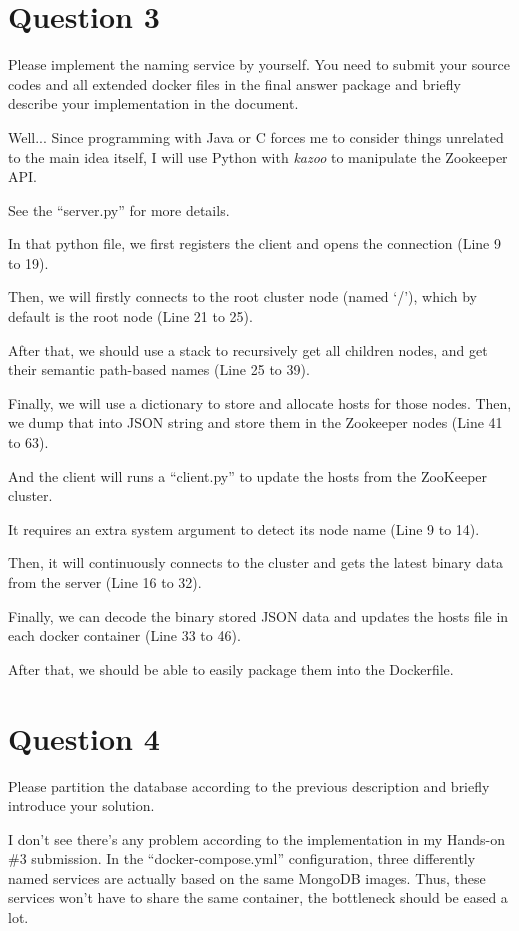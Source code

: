 \documentclass[11pt, oneside]{article}   	%
\begin{document}
\section*{Question 3}
Please implement the naming service by yourself. You need to submit your source codes and all extended docker files in the final answer package and briefly describe your implementation in the document.
\newline

Well... Since programming with Java or C forces me to consider things unrelated to the main idea itself, I will use Python with \textit{kazoo} to manipulate the Zookeeper API.
\newline

See the ``server.py'' for more details.

In that python file, we first registers the client and opens the connection (Line 9 to 19).

Then, we will firstly connects to the root cluster node (named `/'), which by default is the root node (Line 21 to 25).

After that, we should use a stack to recursively get all children nodes, and get their semantic path-based names (Line 25 to 39).

Finally, we will use a dictionary to store and allocate hosts for those nodes. Then, we dump that into JSON string and store them in the Zookeeper nodes (Line 41 to 63).
\newline

And the client will runs a ``client.py'' to update the hosts from the ZooKeeper cluster.

It requires an extra system argument to detect its node name (Line 9 to 14).

Then, it will continuously connects to the cluster and gets the latest binary data from the server (Line 16 to 32).

Finally, we can decode the binary stored JSON data and updates the hosts file in each docker container (Line 33 to 46).
\newline

After that, we should be able to easily package them into the Dockerfile.

\section*{Question 4}
Please partition the database according to the previous description and briefly introduce your solution.
\newline

I don't see there's any problem according to the implementation in my Hands-on \#3 submission. In the ``docker-compose.yml'' configuration, three differently named services are actually based on the same MongoDB images. Thus, these services won't have to share the same container, the bottleneck should be eased a lot.
\end{document}
